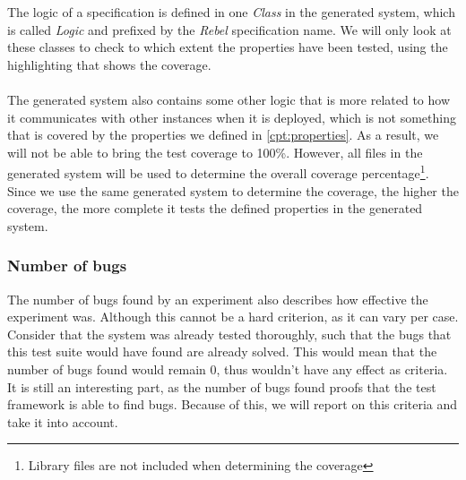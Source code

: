 \FloatBarrier\noindent
The logic of a specification is defined in one \textit{Class} in the generated
system, which is called \textit{Logic} and prefixed by the \textit{Rebel}
specification name. We will only look at these classes to check to which extent
the properties have been tested, using the highlighting that shows the
coverage.\\
\\
The generated system also contains some other logic that is more related to how
it communicates with other instances when it is deployed, which is not something
that is covered by the properties we defined in \autoref{cpt:properties}. As a
result, we will not be able to bring the test coverage to 100\%. However, all
files in the generated system will be used to determine the overall coverage
percentage\footnote{Library files are not included when determining the coverage}.
Since we use the same generated system to determine the coverage, the higher the
coverage, the more complete it tests the defined properties in the generated
system.

\subsubsection{Number of bugs}
The number of bugs found by an experiment also describes how effective the
experiment was. Although this cannot be a hard criterion, as it can vary per
case. Consider that the system was already tested thoroughly, such that the bugs
that this test suite would have found are already solved. This would mean that
the number of bugs found would remain 0, thus wouldn't have any effect as
criteria. It is still an interesting part, as the number of bugs found proofs
that the test framework is able to find bugs. Because of this, we will report on
this criteria and take it into account.




